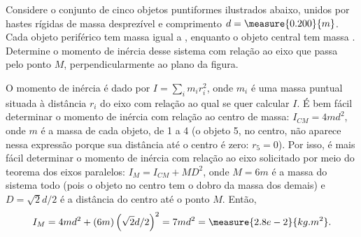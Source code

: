 \begin{question}
	Considere o conjunto de cinco objetos puntiformes ilustrados abaixo, unidos por hastes rígidas de massa desprezível e comprimento $d = \measure{0.200}{m}$.
	Cada objeto periférico tem massa igual a , enquanto o objeto central tem massa .
	Determine o momento de inércia desse sistema com relação ao eixo que passa pelo ponto $M$, perpendicularmente ao plano da figura.


	\begin{answer}
	\end{answer}

	\begin{solution}
		O momento de inércia é dado por $I = \sum_i m_i r_i^2$, onde $m_i$ é uma massa puntual situada à distância $r_i$ do eixo com relação ao qual se quer calcular $I$.
		É bem fácil determinar o momento de inércia com relação ao centro de massa: $I_{CM} = 4md^2$, onde $m$ é a massa de cada objeto, de 1 a 4 (o objeto 5, no centro, não aparece nessa expressão porque sua distância até o centro é zero: $r_5 = 0$).
		Por isso, é mais fácil determinar o momento de inércia com relação ao eixo solicitado por meio do teorema dos eixos paralelos: $I_M = I_{CM} + MD^2$, onde $M = 6m$ é a massa do sistema todo (pois o objeto no centro tem o dobro da massa dos demais) e $D = \sqrt{2}d/2$ é a distância do centro até o ponto $M$.
		Então,
		\begin{equation*}
			I_M = 4md^2 + (6m)\left(\sqrt{2}d/2\right)^2 = 7md^2 = \measure{2.8e-2}{kg.m^2}.
		\end{equation*}
	\end{solution}
\end{question}

\begin{comment}
```python
def question_2i(d, m):
	return 7.0 * m * d**2
```
\end{comment}